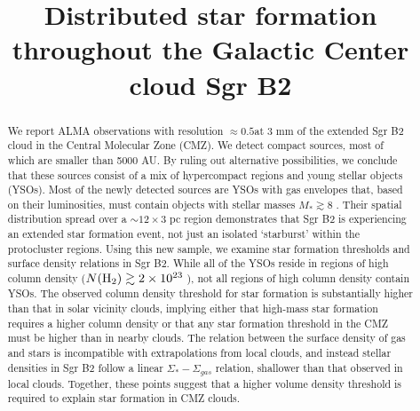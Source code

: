 \documentclass[twocolumn]{aastex61}
\begin{document}
\title{Distributed star formation throughout the Galactic Center cloud Sgr B2}

\begin{abstract}
We report ALMA observations with resolution $\approx0.5$\arcsec at 3 mm  of the
extended Sgr B2 cloud in the Central Molecular Zone (CMZ). We detect \ncores
compact sources, most of which are smaller than 5000 AU.  By ruling out
alternative possibilities, we conclude that these sources consist of a mix of
hypercompact \hii regions and young stellar objects (YSOs).  Most of the
newly detected sources are YSOs with gas envelopes that, based on their
luminosities, must contain objects with stellar masses $M_*\gtrsim8$ \msun.
Their spatial distribution spread over a $\sim12\times3$ pc region demonstrates
that Sgr B2 is experiencing an extended star formation event, not just an
isolated `starburst' within the protocluster regions.  Using this new sample,
we examine star formation thresholds and surface density relations in Sgr B2.
While all of the YSOs reside in regions of high column density
($N(\textrm{H}_{2})\gtrsim2\times10^{23}$ \persc), not all regions of high column density
contain YSOs.  The observed column density threshold for star formation is
substantially higher than that in solar vicinity clouds, implying either that
high-mass star formation requires a higher column density or that any star
formation threshold in the CMZ must be higher than in nearby clouds.  The
relation between the surface density of gas and stars is incompatible with
extrapolations from local clouds, and instead stellar densities in Sgr B2
follow a linear $\Sigma_*-\Sigma_{gas}$ relation, shallower than that observed
in local clouds.  Together, these points suggest that a higher volume density
threshold is required to explain star formation in CMZ clouds.



\end{abstract}

\end{document}
